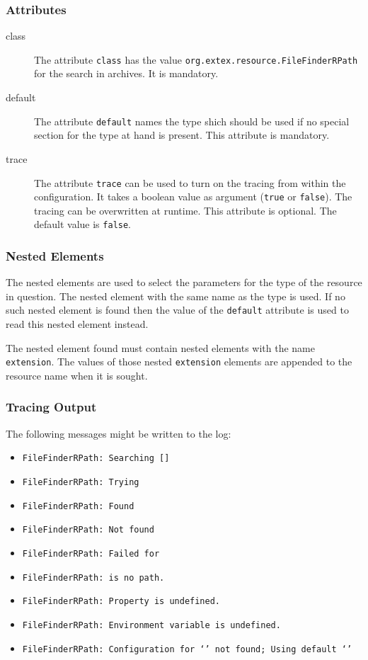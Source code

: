 \subsubsection*{Attributes}
\begin{description}
\item[class] The attribute \texttt{class} has the value
  \texttt{org.extex.resource.FileFinderRPath} for the search in
  archives. It is mandatory.
\item[default] The attribute \texttt{default} names the type shich
  should be used if no special section for the type at hand is
  present. This attribute is mandatory.
\item[trace] The attribute \texttt{trace} can be used to turn on the
  tracing from within the configuration. It takes a boolean value as
  argument (\texttt{true} or \texttt{false}). The tracing can be
  overwritten at runtime. This attribute is optional. The default
  value is \texttt{false}.
\end{description}

\subsubsection*{Nested Elements}

The nested elements are used to select the parameters for the type of
the resource in question. The nested element with the same name as the
type is used. If no such nested element is found then the value of the
\texttt{default} attribute is used to read this nested element
instead. 

The nested element found must contain nested elements with the name
\texttt{extension}. The values of those nested \texttt{extension}
elements are appended to the resource name when it is sought.


\subsubsection*{Tracing Output}

The following messages might be written to the log:

{\small
\begin{itemize}
\item{\tt FileFinderRPath: Searching  []}
\item{\tt FileFinderRPath: Trying }
\item{\tt FileFinderRPath: Found }
\item{\tt FileFinderRPath: Not found }
\item{\tt FileFinderRPath: Failed for }
\item{\tt FileFinderRPath:  is no path.}
\item{\tt FileFinderRPath: Property  is undefined.}
\item{\tt FileFinderRPath: Environment variable  is undefined.}
\item{\tt FileFinderRPath: Configuration for `' not
    found; Using default `'}
\end{itemize}}

